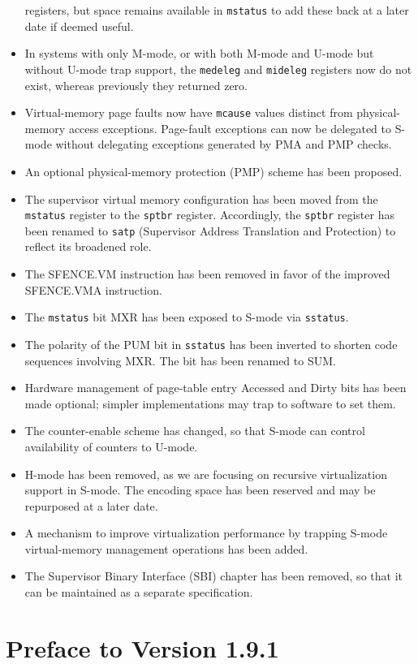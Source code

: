 \begin{itemize}
  registers, but space remains available in {\tt mstatus} to add these
  back at a later date if deemed useful.
\item In systems with only M-mode, or with both M-mode and U-mode but
  without U-mode trap support, the {\tt medeleg} and {\tt mideleg}
    registers now do not exist, whereas previously they returned zero.
\item Virtual-memory page faults now have {\tt mcause} values distinct from
  physical-memory access exceptions.  Page-fault exceptions can now be
  delegated to S-mode without delegating exceptions generated by PMA
  and PMP checks.
\item An optional physical-memory protection (PMP) scheme has been proposed.
\item The supervisor virtual memory configuration has been moved from the
  {\tt mstatus} register to the {\tt sptbr} register.  Accordingly, the
  {\tt sptbr} register has been renamed to {\tt satp} (Supervisor Address
  Translation and Protection) to reflect its broadened role.
\item The SFENCE.VM instruction has been removed in favor of the improved
  SFENCE.VMA instruction.
\item The {\tt mstatus} bit MXR has been exposed to S-mode via {\tt sstatus}.
\item The polarity of the PUM bit in {\tt sstatus} has been inverted to
  shorten code sequences involving MXR.  The bit has been renamed to SUM.
\item Hardware management of page-table entry Accessed and Dirty bits has
  been made optional; simpler implementations may trap to software to
  set them.
\item The counter-enable scheme has changed, so that S-mode can
  control availability of counters to U-mode.
\item H-mode has been removed, as we are focusing on recursive
  virtualization support in S-mode.  The encoding space has been
  reserved and may be repurposed at a later date.
\item A mechanism to improve virtualization performance by
  trapping S-mode virtual-memory management operations has been added.
\item The Supervisor Binary Interface (SBI) chapter has been removed, so
  that it can be maintained as a separate specification.
\end{itemize}

\newpage

\section*{Preface to Version 1.9.1}

